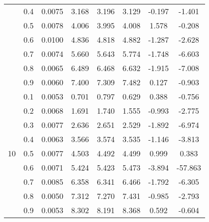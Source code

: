 \documentclass[11pt,a4paper]{report}
\begin{document}
\begin{longtable}{ | c | c || c | c | c | c | c | c | }
 & 0.4 & 0.0075 & 3.168 & 3.196 & 3.129 & -0.197 & -1.401 \\
 & 0.5 & 0.0078 & 4.006 & 3.995 & 4.008 & 1.578 & -0.208 \\
 & 0.6 & 0.0100 & 4.836 & 4.818 & 4.882 & -1.287 & -2.628 \\
 & 0.7 & 0.0074 & 5.660 & 5.643 & 5.774 & -1.748 & -6.603 \\
 & 0.8 & 0.0065 & 6.489 & 6.468 & 6.632 & -1.915 & -7.008 \\
 & 0.9 & 0.0060 & 7.400 & 7.309 & 7.482 & 0.127 & -0.903 \\
 \hline
\multirow{9}{*}{10} & 0.1 & 0.0053 & 0.701 & 0.797 & 0.629 & 0.388 & -0.756 \\
 & 0.2 & 0.0068 & 1.691 & 1.740 & 1.555 & -0.993 & -2.775 \\
 & 0.3 & 0.0077 & 2.636 & 2.651 & 2.529 & -1.892 & -6.974 \\
 & 0.4 & 0.0063 & 3.566 & 3.574 & 3.535 & -1.146 & -3.813 \\
 & 0.5 & 0.0077 & 4.503 & 4.492 & 4.499 & 0.999 & 0.383 \\
 & 0.6 & 0.0071 & 5.424 & 5.423 & 5.473 & -3.894 & -57.863 \\
 & 0.7 & 0.0085 & 6.358 & 6.341 & 6.466 & -1.792 & -6.305 \\
 & 0.8 & 0.0050 & 7.312 & 7.270 & 7.431 & -0.985 & -2.793 \\
 & 0.9 & 0.0053 & 8.302 & 8.191 & 8.368 & 0.592 & -0.604 \\
 \hline
\hline
\end{longtable}
\end{document}
